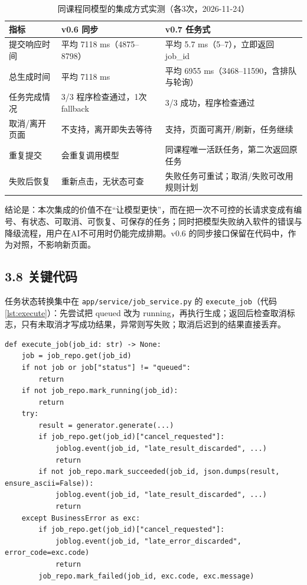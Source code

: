 \documentclass[UTF8,12pt,a4paper]{ctexart}
\begin{document}
\begin{table}[H]
\centering
\caption{同课程同模型的集成方式实测（各3次，2026-11-24）}
\label{tab:metrics}
\small
\begin{tabularx}{\textwidth}{L{4.2cm}L{4.6cm}X}
\toprule
指标 & v0.6 同步 & v0.7 任务式 \\
\midrule
提交响应时间 & 平均 7118 ms（4875--8798） & 平均 5.7 ms（5--7），立即返回 job\_id \\
总生成时间 & 平均 7118 ms & 平均 6955 ms（3468--11590，含排队与轮询） \\
任务完成情况 & 3/3 程序检查通过，1次 fallback & 3/3 成功，程序检查通过 \\
取消/离开页面 & 不支持，离开即失去等待 & 支持，页面可离开/刷新，任务继续 \\
重复提交 & 会重复调用模型 & 同课程唯一活跃任务，第二次返回原任务 \\
失败后恢复 & 重新点击，无状态可查 & 失败任务可重试；取消/失败可改用规则计划 \\
\bottomrule
\end{tabularx}
\end{table}

结论是：本次集成的价值不在“让模型更快”，而在把一次不可控的长请求变成有编号、有状态、可取消、可恢复、可保存的任务；同时把模型失败纳入软件的错误与降级流程，用户在AI不可用时仍能完成排期。v0.6 的同步接口保留在代码中，作为对照，不影响新页面。

\subsection*{3.8 关键代码}

任务状态转换集中在 \texttt{app/service/job\_service.py} 的 \texttt{execute\_job}（代码\ref{lst:execute}）：先尝试把 queued 改为 running，再执行生成；返回后检查取消标志，只有未取消才写成功结果，异常则写失败；取消后迟到的结果直接丢弃。

\begin{lstlisting}[caption={后台执行与迟到结果处理},label={lst:execute}]
def execute_job(job_id: str) -> None:
    job = job_repo.get(job_id)
    if not job or job["status"] != "queued":
        return
    if not job_repo.mark_running(job_id):
        return
    try:
        result = generator.generate(...)
        if job_repo.get(job_id)["cancel_requested"]:
            joblog.event(job_id, "late_result_discarded", ...)
            return
        if not job_repo.mark_succeeded(job_id, json.dumps(result, ensure_ascii=False)):
            joblog.event(job_id, "late_result_discarded", ...)
            return
    except BusinessError as exc:
        if job_repo.get(job_id)["cancel_requested"]:
            joblog.event(job_id, "late_error_discarded", error_code=exc.code)
            return
        job_repo.mark_failed(job_id, exc.code, exc.message)
\end{lstlisting}
\end{document}

